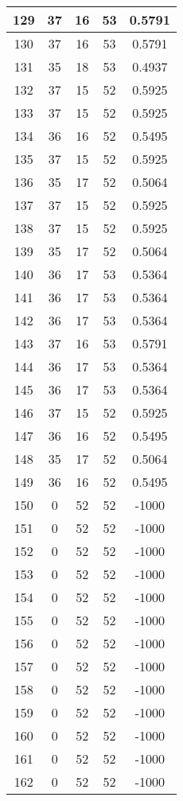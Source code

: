 \documentclass[letterpaper, 12pt]{article}
\begin{document}
\begin{longtable}{|c|c|c|c|c|}
\hline
129 & 37 & 16 & 53 & 0.5791 \\
\hline
130 & 37 & 16 & 53 & 0.5791 \\
\hline
131 & 35 & 18 & 53 & 0.4937 \\
\hline
132 & 37 & 15 & 52 & 0.5925 \\
\hline
133 & 37 & 15 & 52 & 0.5925 \\
\hline
134 & 36 & 16 & 52 & 0.5495 \\
\hline
135 & 37 & 15 & 52 & 0.5925 \\
\hline
136 & 35 & 17 & 52 & 0.5064 \\
\hline
137 & 37 & 15 & 52 & 0.5925 \\
\hline
138 & 37 & 15 & 52 & 0.5925 \\
\hline
139 & 35 & 17 & 52 & 0.5064 \\
\hline
140 & 36 & 17 & 53 & 0.5364 \\
\hline
141 & 36 & 17 & 53 & 0.5364 \\
\hline
142 & 36 & 17 & 53 & 0.5364 \\
\hline
143 & 37 & 16 & 53 & 0.5791 \\
\hline
144 & 36 & 17 & 53 & 0.5364 \\
\hline
145 & 36 & 17 & 53 & 0.5364 \\
\hline
146 & 37 & 15 & 52 & 0.5925 \\
\hline
147 & 36 & 16 & 52 & 0.5495 \\
\hline
148 & 35 & 17 & 52 & 0.5064 \\
\hline
149 & 36 & 16 & 52 & 0.5495 \\
\hline
150 & 0 & 52 & 52 & -1000 \\
\hline
151 & 0 & 52 & 52 & -1000 \\
\hline
152 & 0 & 52 & 52 & -1000 \\
\hline
153 & 0 & 52 & 52 & -1000 \\
\hline
154 & 0 & 52 & 52 & -1000 \\
\hline
155 & 0 & 52 & 52 & -1000 \\
\hline
156 & 0 & 52 & 52 & -1000 \\
\hline
157 & 0 & 52 & 52 & -1000 \\
\hline
158 & 0 & 52 & 52 & -1000 \\
\hline
159 & 0 & 52 & 52 & -1000 \\
\hline
160 & 0 & 52 & 52 & -1000 \\
\hline
161 & 0 & 52 & 52 & -1000 \\
\hline
162 & 0 & 52 & 52 & -1000 \\

\end{longtable}
\end{document}

